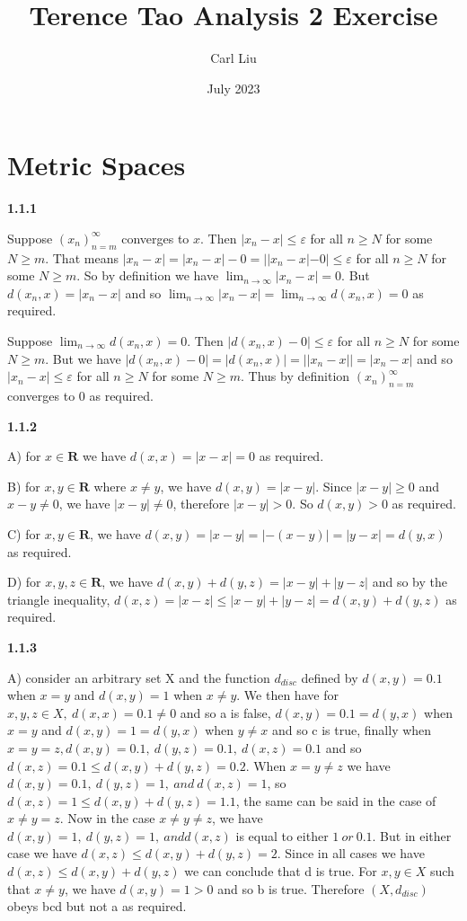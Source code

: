 \documentclass[12pt]{article}
\title{Terence Tao Analysis 2 Exercise}
\author{Carl Liu}
\date{July 2023}
\begin{document}
\maketitle
\tableofcontents

\section{Metric Spaces}

\indent \textbf{1.1.1}

Suppose $(x_n)^\infty_{n=m}$ converges to $x$. Then $|x_n-x|\leq \varepsilon$ for all $n\geq N$ for some $N\geq m$. That means $|x_n-x|=|x_n-x|-0=||x_n-x|-0|\leq \varepsilon$ for all $n\geq N$ for some $N\geq m$. So by definition we have $\lim_{n\to\infty}|x_n-x|=0$. But $d(x_n,x)=|x_n-x|$ and so $\lim_{n\to\infty}|x_n-x|=\lim_{n\to\infty}d(x_n,x)=0$ as required.

Suppose $\lim_{n\to\infty}d(x_n,x)=0$. Then $|d(x_n,x)-0|\leq \varepsilon$ for all $n\geq N$ for some $N\geq m$. But we have $|d(x_n,x)-0|= |d(x_n,x)|= ||x_n-x||=|x_n-x|$ and so $|x_n-x|\leq \varepsilon $ for all $n\geq N$ for some $N\geq m$. Thus by definition $(x_n)^\infty_{n=m}$ converges to 0 as required.

\textbf{1.1.2}

A) for $x\in \textbf{R}$ we have $d(x,x)=|x-x|= 0$ as required.

B) for $x,y\in \textbf{R}$ where $x\neq y$, we have $d(x,y)=|x-y|$. Since $|x-y| \geq 0$ and $x-y\neq 0$, we have $|x-y|\neq 0$, therefore $|x-y|>0$. So $d(x,y)>0$ as required.

C) for $x,y\in \textbf{R}$, we have $d(x,y)=|x-y|= |-(x-y)|= |y-x|= d(y,x)$ as required. 

D) for $x,y,z\in \textbf{R}$, we have $d(x,y)+d(y,z)=|x-y|+|y-z|$ and so by the triangle inequality, $d(x,z)=|x-z|\leq|x-y|+|y-z|=d(x,y)+d(y,z)$ as required.

\textbf{1.1.3}

A) consider an arbitrary set X and the function $d_{disc}$ defined by $d(x,y) = 0.1$ when $x=y$ and $d(x,y)= 1$ when $x\neq y$. We then have for $x,y,z\in X,\ d(x,x) = 0.1 \neq 0$ and so a is false, $d(x,y) = 0.1 = d(y,x)$ when $x=y$ and $d(x,y)= 1 = d(y,x)$ when $y\neq x$ and so c is true, finally when $x=y=z, d(x,y) = 0.1,\ d(y,z) = 0.1,\ d(x,z) = 0.1$ and so $d(x,z)=0.1\leq d(x,y)+d(y,z)=0.2$. When $x=y\neq z$ we have $d(x,y) = 0.1,\ d(y,z) = 1,\ and\ d(x,z) = 1$, so $d(x,z) = 1\leq d(x,y) + d(y,z) = 1.1$, the same can be said in the case of $x\neq y=z$. Now in the case $x\neq y\neq z$, we have $d(x,y)=1,\ d(y,z) = 1,\ and d(x,z)$ is equal to either $1\ or \ 0.1$. But in either case we have $d(x,z) \leq d(x,y)+d(y,z)= 2$. Since in all cases we have $d(x,z)\leq d(x,y)+d(y,z)$ we can conclude that d is true. For $x,y\in X$ such that $x\neq y$, we have $d(x,y)= 1> 0$ and so b is true. Therefore $(X,d_{disc})$ obeys bcd but not a as required.
\end{document}
